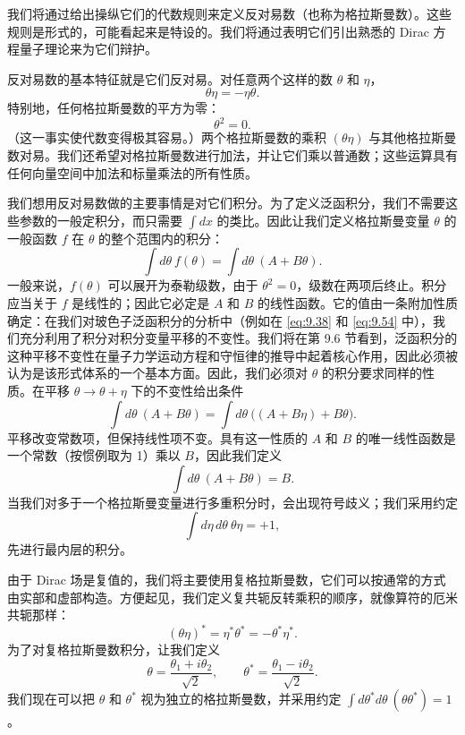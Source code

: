 我们将通过给出操纵它们的代数规则来定义反对易数（也称为格拉斯曼数）。这些规则是形式的，可能看起来是特设的。我们将通过表明它们引出熟悉的 Dirac 方程量子理论来为它们辩护。

反对易数的基本特征就是它们反对易。对任意两个这样的数 $\theta$ 和 $\eta$，
\begin{equation}
  \theta\eta = -\eta\theta .
  \label{eq:9.62}
\end{equation}
特别地，任何格拉斯曼数的平方为零：
\begin{equation}
  \theta^2 = 0 .
\end{equation}
（这一事实使代数变得极其容易。）两个格拉斯曼数的乘积 $(\theta\eta)$ 与其他格拉斯曼数对易。我们还希望对格拉斯曼数进行加法，并让它们乘以普通数；这些运算具有任何向量空间中加法和标量乘法的所有性质。

我们想用反对易数做的主要事情是对它们积分。为了定义泛函积分，我们不需要这些参数的一般定积分，而只需要 $\int dx$ 的类比。因此让我们定义格拉斯曼变量 $\theta$ 的一般函数 $f$ 在 $\theta$ 的整个范围内的积分：
\begin{equation}
  \int d\theta\ f(\theta) = \int d\theta\ (A + B\theta) .
\end{equation}
一般来说，$f(\theta)$ 可以展开为泰勒级数，由于 $\theta^2 = 0$，级数在两项后终止。积分应当关于 $f$ 是线性的；因此它必定是 $A$ 和 $B$ 的线性函数。它的值由一条附加性质确定：在我们对玻色子泛函积分的分析中（例如在 \eqref{eq:9.38} 和 \eqref{eq:9.54} 中），我们充分利用了积分对积分变量平移的不变性。我们将在第 9.6 节看到，泛函积分的这种平移不变性在量子力学运动方程和守恒律的推导中起着核心作用，因此必须被认为是该形式体系的一个基本方面。因此，我们必须对 $\theta$ 的积分要求同样的性质。在平移 $\theta\to\theta+\eta$ 下的不变性给出条件
\begin{equation}
  \int d\theta\ (A+B\theta) = \int d\theta\ \bigl( (A+B\eta) + B\theta \bigr) .
\end{equation}
平移改变常数项，但保持线性项不变。具有这一性质的 $A$ 和 $B$ 的唯一线性函数是一个常数（按惯例取为 1）乘以 $B$，因此我们定义
\begin{equation}
  \int d\theta\ (A + B\theta) = B .
  \label{eq:9.63}
\end{equation}
当我们对多于一个格拉斯曼变量进行多重积分时，会出现符号歧义；我们采用约定
\begin{equation}
  \int d\eta\,d\theta\ \theta\eta = +1 ,
  \label{eq:9.64}
\end{equation}
先进行最内层的积分。

由于 Dirac 场是复值的，我们将主要使用复格拉斯曼数，它们可以按通常的方式由实部和虚部构造。方便起见，我们定义复共轭反转乘积的顺序，就像算符的厄米共轭那样：
\begin{equation}
  (\theta\eta)^{*} = \eta^{*}\theta^{*} = -\theta^{*}\eta^{*} .
  \label{eq:9.65}
\end{equation}
为了对复格拉斯曼数积分，让我们定义
\begin{equation}
  \theta = \frac{\theta_1 + i\theta_2}{\sqrt{2}},\qquad
  \theta^{*} = \frac{\theta_1 - i\theta_2}{\sqrt{2}} .
\end{equation}
我们现在可以把 $\theta$ 和 $\theta^{*}$ 视为独立的格拉斯曼数，并采用约定 $\int d\theta^{*}d\theta\ (\theta\theta^{*}) = 1$。

